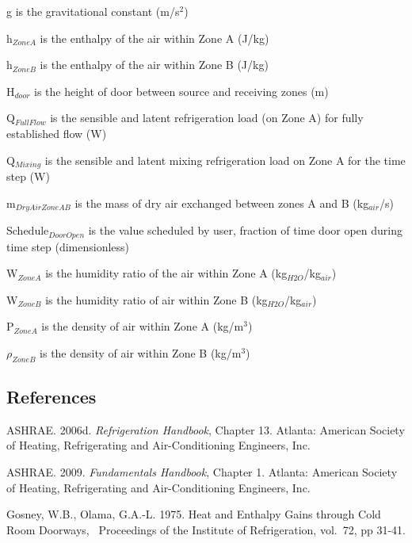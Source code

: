 g is the gravitational constant (m/s\(^{2}\))

h\(_{ZoneA}\) is the enthalpy of the air within Zone A (J/kg)

h\(_{ZoneB}\) is the  enthalpy of the air within Zone B (J/kg)

H\(_{door}\) is the height of door between source and receiving zones (m)

Q\(_{FullFlow}\) is the sensible and latent refrigeration load (on Zone A) for fully established flow (W)

Q\(_{Mixing}\) is the sensible and latent mixing refrigeration load on Zone A for the time step (W)

m\(_{DryAirZoneAB}\) is the mass of dry air exchanged between zones A and B (kg\(_{air}\)/s)

Schedule\(_{DoorOpen}\) is the value scheduled by user, fraction of time door open during time step (dimensionless)

W\(_{ZoneA}\) is the humidity ratio of the air within Zone A (kg\(_{H2O}\)/kg\(_{air}\))

W\(_{ZoneB}\) is the humidity ratio of air within Zone B (kg\(_{H2O}\)/kg\(_{air}\))

P\(_{ZoneA}\) is the density of air within Zone A (kg/m\(^{3}\))

\(\rho_{ZoneB}\) is the density of air within Zone B (kg/m\(^{3}\))

\subsection{References}\label{references-201709281619}

ASHRAE. 2006d. \emph{Refrigeration Handbook}, Chapter 13. Atlanta: American Society of Heating, Refrigerating and Air-Conditioning Engineers, Inc.

ASHRAE. 2009. \emph{Fundamentals Handbook}, Chapter 1. Atlanta: American Society of Heating, Refrigerating and Air-Conditioning Engineers, Inc.

Gosney, W.B., Olama, G.A.-L. 1975. Heat and Enthalpy Gains through Cold Room Doorways,~ Proceedings of the Institute of Refrigeration, vol.~72, pp 31-41.
